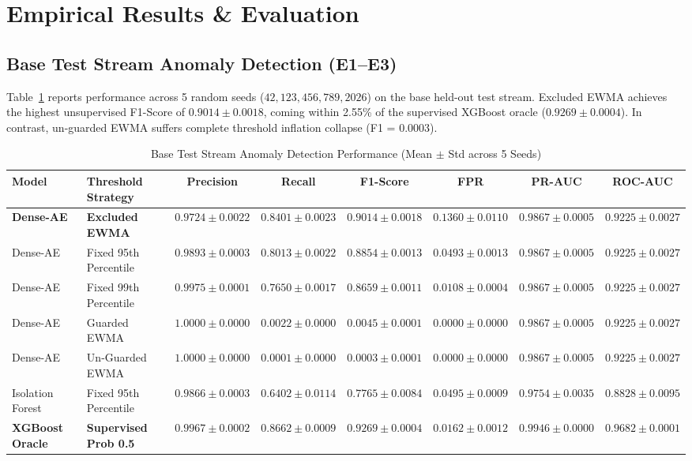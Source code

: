 \documentclass[journal]{IEEEtran}
\begin{document}
\section{Empirical Results \& Evaluation}

\subsection{Base Test Stream Anomaly Detection (E1--E3)}
Table~\ref{tab:base_stream} reports performance across 5 random seeds ($42, 123, 456, 789, 2026$) on the base held-out test stream. Excluded EWMA achieves the highest unsupervised F1-Score of $0.9014 \pm 0.0018$, coming within 2.55\% of the supervised XGBoost oracle ($0.9269 \pm 0.0004$). In contrast, un-guarded EWMA suffers complete threshold inflation collapse (F1 = $0.0003$).

\begin{table}[t]
\centering
\caption{Base Test Stream Anomaly Detection Performance (Mean $\pm$ Std across 5 Seeds)}
\label{tab:base_stream}
\begin{tabular}{llcccccc}
\toprule
Model & Threshold Strategy & Precision & Recall & F1-Score & FPR & PR-AUC & ROC-AUC \\
\midrule
\textbf{Dense-AE} & \textbf{Excluded EWMA} & $0.9724 \pm 0.0022$ & $\mathbf{0.8401 \pm 0.0023}$ & $\mathbf{0.9014 \pm 0.0018}$ & $0.1360 \pm 0.0110$ & $0.9867 \pm 0.0005$ & $0.9225 \pm 0.0027$ \\
Dense-AE & Fixed 95th Percentile & $0.9893 \pm 0.0003$ & $0.8013 \pm 0.0022$ & $0.8854 \pm 0.0013$ & $0.0493 \pm 0.0013$ & $0.9867 \pm 0.0005$ & $0.9225 \pm 0.0027$ \\
Dense-AE & Fixed 99th Percentile & $0.9975 \pm 0.0001$ & $0.7650 \pm 0.0017$ & $0.8659 \pm 0.0011$ & $0.0108 \pm 0.0004$ & $0.9867 \pm 0.0005$ & $0.9225 \pm 0.0027$ \\
Dense-AE & Guarded EWMA & $1.0000 \pm 0.0000$ & $0.0022 \pm 0.0000$ & $0.0045 \pm 0.0001$ & $0.0000 \pm 0.0000$ & $0.9867 \pm 0.0005$ & $0.9225 \pm 0.0027$ \\
Dense-AE & Un-Guarded EWMA & $1.0000 \pm 0.0000$ & $0.0001 \pm 0.0000$ & $0.0003 \pm 0.0001$ & $0.0000 \pm 0.0000$ & $0.9867 \pm 0.0005$ & $0.9225 \pm 0.0027$ \\
Isolation Forest & Fixed 95th Percentile & $0.9866 \pm 0.0003$ & $0.6402 \pm 0.0114$ & $0.7765 \pm 0.0084$ & $0.0495 \pm 0.0009$ & $0.9754 \pm 0.0035$ & $0.8828 \pm 0.0095$ \\
\textbf{XGBoost Oracle} & \textbf{Supervised Prob 0.5} & $0.9967 \pm 0.0002$ & $\mathbf{0.8662 \pm 0.0009}$ & $\mathbf{0.9269 \pm 0.0004}$ & $0.0162 \pm 0.0012$ & $0.9946 \pm 0.0000$ & $0.9682 \pm 0.0001$ \\
\bottomrule
\end{tabular}
\end{table}
\end{document}
